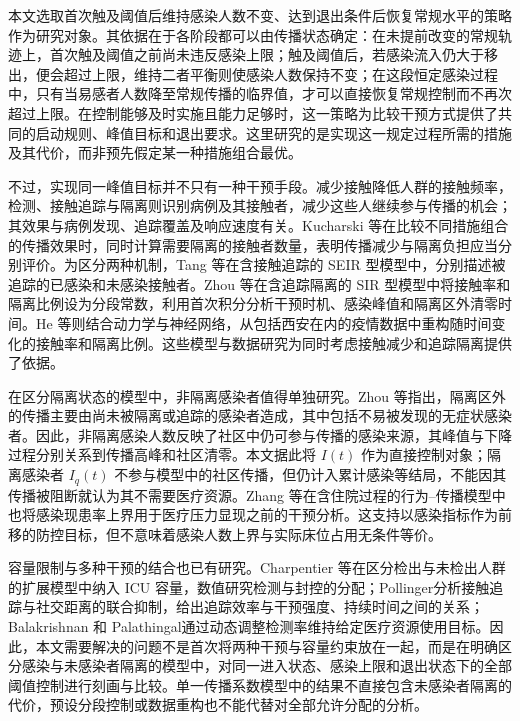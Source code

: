 \documentclass[lang=cn,a4paper,newtx]{elegantpaper}
\numberwithin{equation}{section}
\theoremstyle{plain}
\begin{document}
本文选取首次触及阈值后维持感染人数不变、达到退出条件后恢复常规水平的策略作为研究对象。其依据在于各阶段都可以由传播状态确定：在未提前改变的常规轨迹上，首次触及阈值之前尚未违反感染上限；触及阈值后，若感染流入仍大于移出，便会超过上限，维持二者平衡则使感染人数保持不变；在这段恒定感染过程中，只有当易感者人数降至常规传播的临界值，才可以直接恢复常规控制而不再次超过上限。在控制能够及时实施且能力足够时，这一策略为比较干预方式提供了共同的启动规则、峰值目标和退出要求。这里研究的是实现这一规定过程所需的措施及其代价，而非预先假定某一种措施组合最优。

不过，实现同一峰值目标并不只有一种干预手段。减少接触降低人群的接触频率，检测、接触追踪与隔离则识别病例及其接触者，减少这些人继续参与传播的机会；其效果与病例发现、追踪覆盖及响应速度有关\cite{Hellewell2020,Ferretti2020}。Kucharski 等\cite{Kucharski2020}在比较不同措施组合的传播效果时，同时计算需要隔离的接触者数量，表明传播减少与隔离负担应当分别评价。为区分两种机制，Tang 等\cite{Tang2020Transmission}在含接触追踪的 SEIR 型模型中，分别描述被追踪的已感染和未感染接触者。Zhou 等\cite{Zhou2024SPCI}在含追踪隔离的 SIR 型模型中将接触率和隔离比例设为分段常数，利用首次积分分析干预时机、感染峰值和隔离区外清零时间。He 等\cite{He2023TDINN}则结合动力学与神经网络，从包括西安在内的疫情数据中重构随时间变化的接触率和隔离比例。这些模型与数据研究为同时考虑接触减少和追踪隔离提供了依据。

在区分隔离状态的模型中，非隔离感染者值得单独研究。Zhou 等\cite{Zhou2024SPCI}指出，隔离区外的传播主要由尚未被隔离或追踪的感染者造成，其中包括不易被发现的无症状感染者。因此，非隔离感染人数反映了社区中仍可参与传播的感染来源，其峰值与下降过程分别关系到传播高峰和社区清零。本文据此将 $I(t)$ 作为直接控制对象；隔离感染者 $I_q(t)$ 不参与模型中的社区传播，但仍计入累计感染等结局，不能因其传播被阻断就认为其不需要医疗资源。Zhang 等\cite{Zhang2026Behavior}在含住院过程的行为--传播模型中也将感染现患率上界用于医疗压力显现之前的干预分析。这支持以感染指标作为前移的防控目标，但不意味着感染人数上界与实际床位占用无条件等价。

容量限制与多种干预的结合也已有研究。Charpentier 等\cite{Charpentier2020}在区分检出与未检出人群的扩展模型中纳入 ICU 容量，数值研究检测与封控的分配；Pollinger\cite{Pollinger2023}分析接触追踪与社交距离的联合抑制，给出追踪效率与干预强度、持续时间之间的关系；Balakrishnan 和 Palathingal\cite{Balakrishnan2023}通过动态调整检测率维持给定医疗资源使用目标。因此，本文需要解决的问题不是首次将两种干预与容量约束放在一起，而是在明确区分感染与未感染者隔离的模型中，对同一进入状态、感染上限和退出状态下的全部阈值控制进行刻画与比较。单一传播系数模型中的结果不直接包含未感染者隔离的代价，预设分段控制或数据重构也不能代替对全部允许分配的分析。
\end{document}
